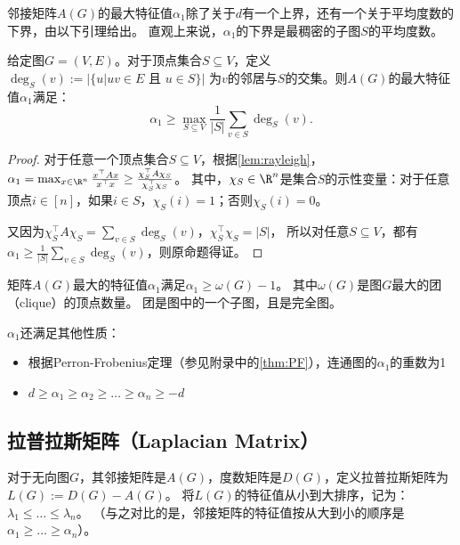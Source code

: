 \documentclass[lang=cn,newtx,10pt,scheme=chinese,chinesefont=nofont,citestyle=gb7714-2015, bibstyle=gb7714-2015]{elegantbook}
\begin{document}
\begin{refsection}
邻接矩阵$A(G)$的最大特征值$\alpha_1$除了关于$d$有一个上界，还有一个关于平均度数的下界，由以下引理给出。
直观上来说，$\alpha_1$的下界是最稠密的子图$S$的平均度数。

\begin{lemma}
    给定图$G=(V,E)$。对于顶点集合$S\subseteq V$，定义$\deg_S(v):=|\{u|uv\in E\text{ 且 }u\in S\}|$
    为$v$的邻居与$S$的交集。则$A(G)$的最大特征值$\alpha_1$满足：
    \[
    \alpha_1\ge\max_{S\subseteq V}\frac{1}{|S|}\sum_{v\in S}\deg_S(v).
    \]
\end{lemma}

\begin{proof}
    对于任意一个顶点集合$S\subseteq V$，根据\cref{lem:rayleigh}，$\alpha_1=\max_{x\in\R^n}\frac{x^\top Ax}{x^\top x}\ge\frac{\chi_S^\top A\chi_S}{\chi_S^\top \chi_S}$。
    其中，$\chi_S\in\R^n$是集合$S$的示性变量：对于任意顶点$i\in[n]$，如果$i\in S$，$\chi_S(i)=1$；否则$\chi_S(i)=0$。

    又因为$\chi_S^\top A\chi_S=\sum_{v\in S}\deg_S(v)$，$\chi_S^\top \chi_S=|S|$，
    所以对任意$S\subseteq V$，都有$\alpha_1\ge\frac{1}{|S|}\sum_{v\in S}\deg_S(v)$，则原命题得证。
\end{proof}


\begin{corollary}
    矩阵$A(G)$最大的特征值$\alpha_1$满足$\alpha_1\ge\omega(G)-1$。
    其中$\omega(G)$是图$G$最大的团（clique）的顶点数量。
    团是图中的一个子图，且是完全图。
\end{corollary}

$\alpha_1$还满足其他性质：
\begin{itemize}
    \item 根据Perron-Frobenius定理（参见附录中的\cref{thm:PF}），连通图的$\alpha_1$的重数为1
    \item $d\ge\alpha_1\ge\alpha_2\ge\dots\ge\alpha_n\ge-d$
\end{itemize}





\subsection{拉普拉斯矩阵（Laplacian Matrix）}

对于无向图$G$，其邻接矩阵是$A(G)$，度数矩阵是$D(G)$，定义拉普拉斯矩阵为$L(G):=D(G)-A(G)$。
将$L(G)$的特征值从小到大排序，记为：$\lambda_1\le\dots\le\lambda_n$。
（与之对比的是，邻接矩阵的特征值按从大到小的顺序是$\alpha_1\ge\dots\ge\alpha_n$）。


\end{refsection}
\end{document}
